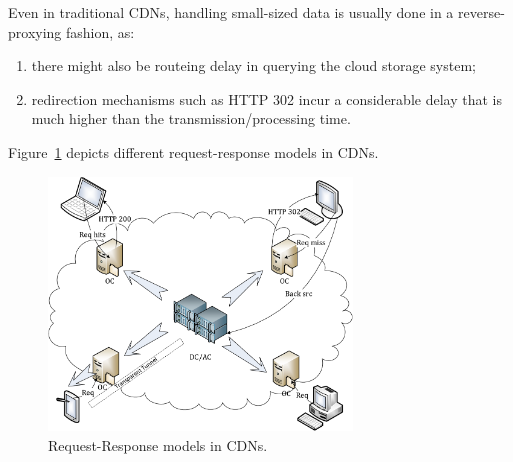 Even in traditional CDNs, handling small-sized data is usually done in a reverse-proxying fashion, as: 
\begin{enumerate}
	\item there might also be routeing delay in querying the cloud storage system; 
	\item redirection mechanisms such as HTTP 302 incur a considerable delay that is much higher than the transmission/processing time.  
\end{enumerate}
Figure~\ref{fig:cdn-req} depicts different request-response models in CDNs. 

\begin{figure}[ht]
	\centering
	\includegraphics[width=0.72\textwidth]{fig/decisions/CDN_req.pdf}
	\caption{Request-Response models in CDNs.}\label{fig:cdn-req}
\end{figure}

